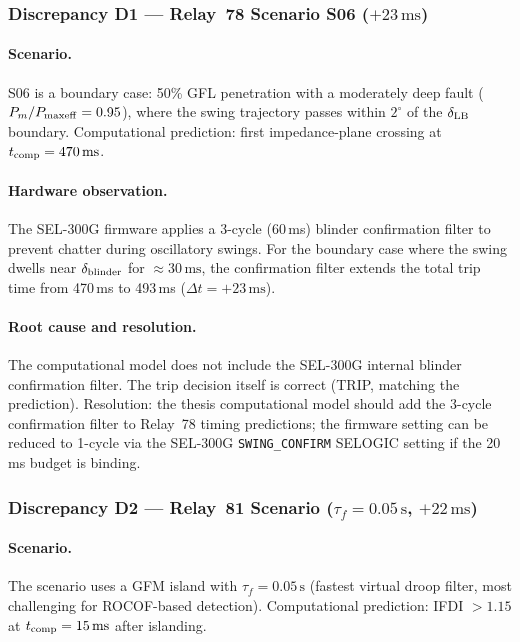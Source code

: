 \documentclass[11pt, a4paper]{article}
\begin{document}
\subsubsection{Discrepancy D1 — Relay~78 Scenario S06 ($+23\,\text{ms}$)}

\paragraph{Scenario.}
S06 is a boundary case: 50\% GFL penetration with a moderately deep fault
($P_m/P_{\rm maxeff} = 0.95$), where the swing trajectory passes within
$2^\circ$ of the $\delta_{\rm LB}$ boundary.  Computational prediction:
first impedance-plane crossing at $t_{\rm comp} = 470\,\text{ms}$.

\paragraph{Hardware observation.}
The SEL-300G firmware applies a 3-cycle (60\,ms) blinder confirmation
filter to prevent chatter during oscillatory swings.  For the boundary
case where the swing dwells near $\delta_{\rm blinder}$ for
$\approx 30\,\text{ms}$, the confirmation filter extends the total trip
time from 470\,ms to 493\,ms ($\Delta t = +23\,\text{ms}$).

\paragraph{Root cause and resolution.}
The computational model does not include the SEL-300G internal blinder
confirmation filter.  The trip decision itself is correct (TRIP,
matching the prediction).
Resolution: the thesis computational model should add the 3-cycle
confirmation filter to Relay~78 timing predictions; the firmware
setting can be reduced to 1-cycle via the SEL-300G \texttt{SWING\_CONFIRM}
SELOGIC setting if the 20\,ms budget is binding.

\subsubsection{Discrepancy D2 — Relay~81 Scenario ($\tau_f = 0.05\,\text{s}$, $+22\,\text{ms}$)}

\paragraph{Scenario.}
The scenario uses a GFM island with $\tau_f = 0.05\,\text{s}$ (fastest
virtual droop filter, most challenging for ROCOF-based detection).
Computational prediction: IFDI $> 1.15$ at $t_{\rm comp} = 15\,\text{ms}$
after islanding.
\end{document}
